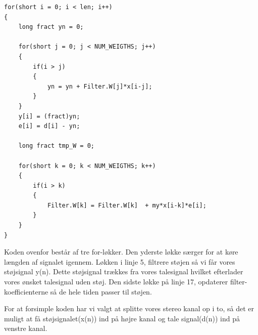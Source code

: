 \newpage


\begin{lstlisting}
for(short i = 0; i < len; i++)
{
	long fract yn = 0;

	for(short j = 0; j < NUM_WEIGTHS; j++)
	{
		if(i > j)
		{
			yn = yn + Filter.W[j]*x[i-j];
		}
	}
	y[i] = (fract)yn;
	e[i] = d[i] - yn;
		
	long fract tmp_W = 0;
		
	for(short k = 0; k < NUM_WEIGTHS; k++)
	{
		if(i > k)
		{
			Filter.W[k] = Filter.W[k]  + my*x[i-k]*e[i];
		}
	}
}
\end{lstlisting}

Koden ovenfor består af tre for-løkker. Den yderste løkke særger for at køre længden af signalet igennem. Løkken i linje 5, filtrere støjen så vi får vores støjsignal y(n). Dette støjsignal trækkes fra vores talesignal hvilket efterlader vores ønsket talesignal uden støj. Den sidste løkke på linje 17, opdaterer filter-koefficienterne så de hele tiden passer til støjen.

For at forsimple koden har vi valgt at splitte vores stereo kanal op i to, så det er muligt at få støjsignalet(x(n)) ind på højre kanal og tale signal(d(n)) ind på venstre kanal.